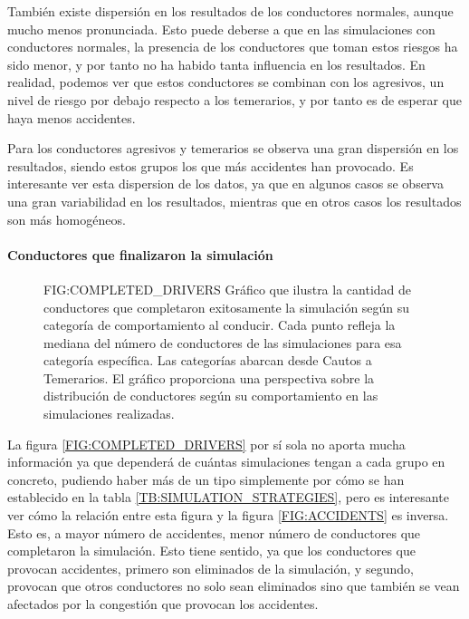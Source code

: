 También existe dispersión en los resultados de los conductores normales, aunque mucho menos pronunciada. Esto puede deberse
a que en las simulaciones con conductores normales, la presencia de los conductores que toman estos riesgos ha sido menor, y por tanto
no ha habido tanta influencia en los resultados. En realidad, podemos ver que estos conductores se combinan con los agresivos, un nivel
de riesgo por debajo respecto a los temerarios, y por tanto es de esperar que haya menos accidentes.

Para los conductores agresivos y temerarios se observa una gran dispersión en los resultados, siendo estos grupos
los que más accidentes han provocado. Es interesante ver esta dispersion de los datos, ya que en algunos casos se observa una gran variabilidad en los resultados,
mientras que en otros casos los resultados son más homogéneos.

\paragraph{Conductores que finalizaron la simulación}

\begin{figure}[Mediana de conductores que completaron la simulación]{FIG:COMPLETED_DRIVERS}{
    Gráfico que ilustra la cantidad de conductores que completaron exitosamente la simulación según su categoría de comportamiento al conducir.
    Cada punto refleja la mediana del número de conductores de las simulaciones para esa categoría específica.
    Las categorías abarcan desde Cautos a Temerarios. El gráfico proporciona una perspectiva sobre la distribución de conductores según
    su comportamiento en las simulaciones realizadas.}
\end{figure}

La figura \ref{FIG:COMPLETED_DRIVERS} por sí sola no aporta mucha información ya que dependerá de cuántas simulaciones tengan a cada grupo en concreto, pudiendo haber más de un tipo simplemente por cómo se han establecido en la tabla \ref{TB:SIMULATION_STRATEGIES}, pero es interesante ver cómo
la relación entre esta figura y la figura \ref{FIG:ACCIDENTS} es inversa. Esto es, a mayor número de accidentes,
menor número de conductores que completaron la simulación. Esto tiene sentido, ya que los conductores que
provocan accidentes, primero son eliminados de la simulación, y segundo, provocan que otros conductores
no solo sean eliminados sino que también se vean afectados por la congestión que provocan los accidentes.

